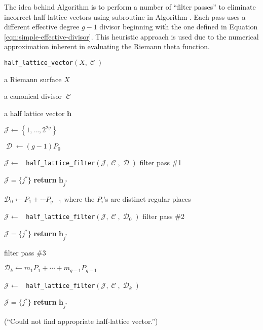 \documentclass[12pt]{article}
\theoremstyle{definition}
\DeclareMathOperator{\DivC}{\mathcal{C}}
\DeclareMathOperator{\DivD}{\mathcal{D}}
\begin{document}
The idea behind Algorithm \label{alg:half-lattice-vector} is to perform
a number of ``filter passes'' to eliminate incorrect half-lattice
vectors using subroutine in
Algorithm \label{alg:half-lattice-filter}. Each pass uses a different
effective degree $g-1$ divisor beginning with the one defined in
Equation \ref{eqn:simple-effective-divisor}. This heuristic approach is
used due to the numerical approximation inherent in evaluating the
Riemann theta function.

\begin{algorithm}
\caption{{\tt half\_lattice\_vector}$(X,\DivC)$}
\label{alg:half-lattice-vector}
\begin{algorithmic}[1]

\Require a Riemann surface $X$

\Require a canonical divisor $\DivC$

\Ensure a half lattice vector $\boldsymbol{h}$

\State $\mathcal{J} \gets \left\{ 1, \ldots, 2^{2g} \right\}$

\State $\DivD \gets (g-1)P_0$

\State $\mathcal{J} \gets$ {\tt
  half\_lattice\_filter}$(\mathcal{J},\DivC,\DivD)$ \Comment filter pass \#1

 $\mathcal{J} = \{j^*\}$ {\bf return} $\boldsymbol{h}_{j^*}$

\State $\mathcal{D}_0 \gets P_1 + \cdots P_{g-1}$ where the $P_i$'s are
distinct regular places

\State $\mathcal{J} \gets$ {\tt
  half\_lattice\_filter}$(\mathcal{J},\DivC,\DivD_0)$ \Comment filter pass \#2

 $\mathcal{J} = \{j^*\}$ {\bf return} $\boldsymbol{h}_{j^*}$

 \Comment filter pass \#3

    \State $\mathcal{D}_k \gets m_1P_1 + \cdots + m_{g-1}P_{g-1}$

    \State $\mathcal{J} \gets$ {\tt
      half\_lattice\_filter}$(\mathcal{J},\DivC,\DivD_k)$

     $\mathcal{J} = \{j^*\}$ {\bf return}
    $\boldsymbol{h}_{j^*}$

\EndFor


(``Could not find appropriate half-lattice vector.'')


\end{algorithmic}
\end{algorithm}
\end{document}
